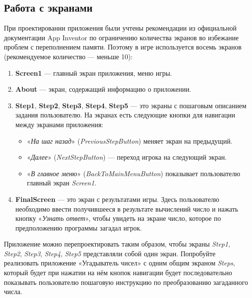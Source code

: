 \subsection{Работа с экранами}
При проектировании приложения были учтены рекомендации из официальной документации App Inventor\cite{MitManyScreens} по ограничению количества экранов во избежание проблем с переполнением памяти.
Поэтому в игре используется восемь экранов (рекомендуемое количество — меньше 10):
\begin{enumerate}
\item \textbf{Screen1} — главный экран приложения, меню игры.
\item \textbf{About} — экран, содержащий информацию о приложении.
\item \textbf{Step1}, \textbf{Step2}, \textbf{Step3}, \textbf{Step4}, \textbf{Step5} — это экраны с пошаговым описанием задания пользователю. На экранах есть следующие кнопки для навигации между экранами приложения:
\begin{itemize}
  \item «\textit{На шаг назад}» (\textit{PreviousStepButton}) меняет экран на предыдущий.
  \item «\textit{Далее}» (\textit{NextStepButton}) — переход игрока на следующий экран.
  \item «\textit{В главное меню}» (\textit{BackToMainMenuButton}) показывает пользователю главный экран \textit{Screen1}.
\end{itemize}
\item \textbf{FinalScreen} — это экран с результатами игры. Здесь пользователю необходимо ввести получившееся в результате вычислений число и нажать кнопку «\textit{Узнать ответ}», чтобы увидеть на экране число, которое по предположению программы загадал игрок.
\end{enumerate}

\begin{mdfstyle}[nobreak=true,frametitle=Упражнение]
\sloppy Приложение можно перепроектировать таким образом, чтобы экраны \textit{Step1}, \textit{Step2}, \textit{Step3}, \textit{Step4}, \textit{Step5} представляли собой один экран. Попробуйте реализовать приложение «Угадыватель чисел» с одним общим экраном \textit{Steps}, который будет при нажатии на нём кнопок навигации будет последовательно показывать пользователю пошаговую инструкцию по преобразованию загаданного числа.\end{mdfstyle}

